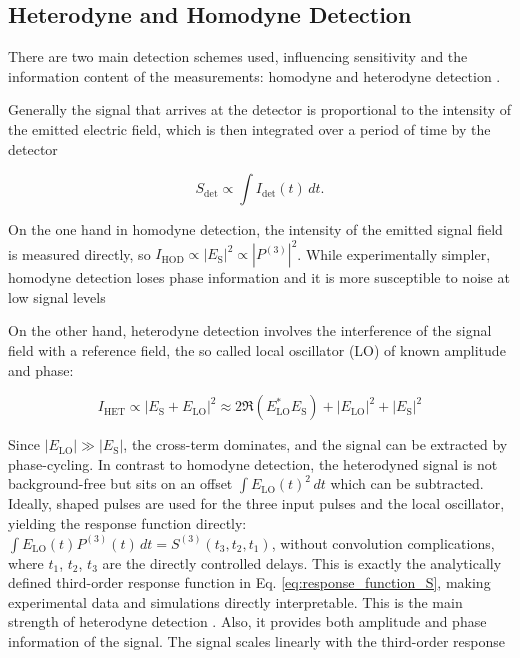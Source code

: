 \subsection{Heterodyne and Homodyne Detection}
\label{subsec:heterodyne_homodyne}

\noindent There are two main detection schemes used, influencing sensitivity and the information content of the measurements: homodyne and heterodyne detection \cite{abramaviciusetal2009coherentmultidimensionaloptical}.

\noindent
Generally the signal that arrives at the detector is proportional to the intensity of the emitted electric field, which is then integrated over a period of time by the detector

\begin{equation}
	S_{\text{det}} \propto \int I_{\text{det}}(t) \, dt.
	\label{eq:signal_intensity}
\end{equation}

\noindent On the one hand in homodyne detection, the intensity of the emitted signal field is measured directly, so $ I_{\text{HOD}} \propto |E_{\text{S}}|^2 \propto |P^{(3)}|^2 $. While experimentally simpler, homodyne detection loses phase information and it is more susceptible to noise at low signal levels %

\noindent On the other hand, heterodyne detection involves the interference of the signal field with a reference field, the so called local oscillator (LO) of known amplitude and phase:

\begin{equation}
	I_{\text{HET}} \propto |E_{\text{S}} + E_{\text{LO}}|^2 \approx 2\Re{(E_{\text{LO}}^*E_{\text{S}})} + |E_{\text{LO}}|^2 + |E_{\text{S}}|^2
	\label{eq:heterodyne}
\end{equation}

\noindent Since $|E_{\text{LO}}| \gg |E_{\text{S}}|$, the cross-term dominates, and the signal can be extracted by phase-cycling. In contrast to homodyne detection, the heterodyned signal is not background-free but sits on an offset $\int E_{\text{LO}}(t)^2 \, dt$ which can be subtracted. Ideally, shaped pulses are used for the three input pulses and the local oscillator, yielding the response function directly: $\int E_{\text{LO}}(t) P^{(3)}(t) \, dt = S^{(3)}(t_3, t_2, t_1)$, without convolution complications, where $t_1$, $t_2$, $t_3$ are the directly controlled delays. This is exactly the analytically defined third-order response function in Eq. \eqref{eq:response_function_S}, making experimental data and simulations directly interpretable. This is the main strength of heterodyne detection \cite{mukamel1995principlesnonlinearoptical}. Also, it provides both amplitude and phase information of the signal. The signal scales linearly with the third-order response  

